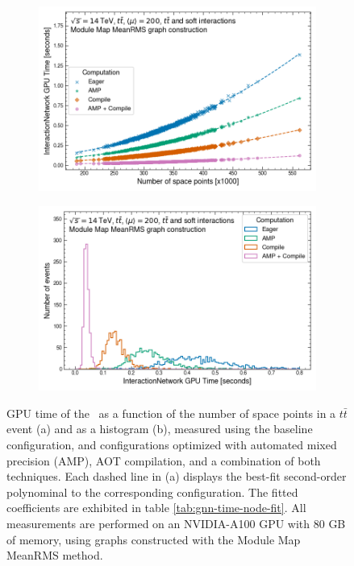 \newpage
\begin{figure}[h!]
    \centering
    \begin{subfigure}[b]{0.62\textwidth}
    \centering
        \includegraphics[width=\textwidth]{figures/rms_80g.png}
        \caption{}
        \label{subfig:gnn-time-node}
    \end{subfigure}

    \begin{subfigure}[b]{0.62\textwidth}\centering
        \includegraphics[width=\textwidth]{figures/rms_80g_hist.png}
        \caption{}
        \label{subfig:gnn-time-hist}
    \end{subfigure}
    \caption{GPU time of the \ignn~as a function of the number of space points in a $t\bar{t}$ event (a) and as a histogram (b), measured using the baseline configuration, and configurations optimized with automated mixed precision (AMP), AOT compilation, and a combination of both techniques. Each dashed line in (a) displays the best-fit second-order polynominal to the corresponding configuration. The fitted coefficients are exhibited in table \ref{tab:gnn-time-node-fit}. All measurements are performed on an NVIDIA-A100 GPU with 80 GB of memory, using graphs constructed with the Module Map MeanRMS method.}
    \label{fig:gnn-time-node}
\end{figure}


